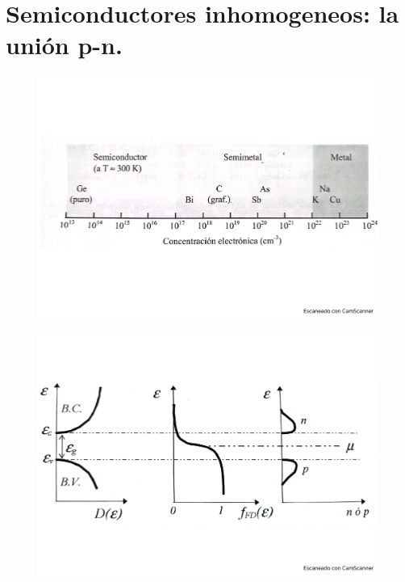\section{Semiconductores inhomogeneos: la unión p-n.}
\begin{figure}[h!] \centering
	\includegraphics[scale=0.5]{Cuerpo/Ch_09/Fotos libro 1.pdf}
	\caption{}
	\label{Fig:09-01}
\end{figure}
\begin{figure}[h!] \centering
	\includegraphics[scale=0.5]{Cuerpo/Ch_09/Fotos libro 2.pdf}
	\caption{}
	\label{Fig:09-02}
\end{figure}
